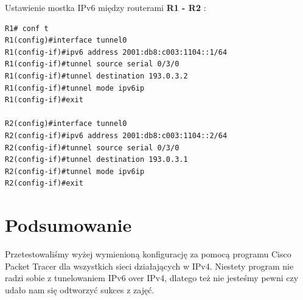 \documentclass[11pt,a4paper]{article}
\begin{document}
\noindent
Ustawienie mostka IPv6 między routerami {\bf R1 - R2} :
\begin{lstlisting}
R1# conf t
R1(config)#interface tunnel0	
R1(config-if)#ipv6 address 2001:db8:c003:1104::1/64
R1(config-if)#tunnel source serial 0/3/0
R1(config-if)#tunnel destination 193.0.3.2
R1(config-if)#tunnel mode ipv6ip
R1(config-if)#exit 

R2(config)#interface tunnel0	
R2(config-if)#ipv6 address 2001:db8:c003:1104::2/64
R2(config-if)#tunnel source serial 0/3/0
R2(config-if)#tunnel destination 193.0.3.1
R2(config-if)#tunnel mode ipv6ip
R2(config-if)#exit 

\end{lstlisting}

\section{Podsumowanie}
Przetestowaliśmy wyżej wymienioną konfigurację za pomocą programu Cisco Packet Tracer dla wszystkich sieci działających w IPv4. Niestety program nie radzi sobie z tunelowaniem IPv6 over IPv4, dlatego też nie jesteśmy pewni czy udało nam się odtworzyć sukces z zajęć. 
\end{document}
